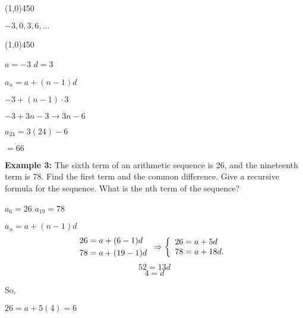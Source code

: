 \documentclass{report}
\begin{document}
\line(1,0){450}

\begin{center}
\begin{large}
	$-3,0,3,6,\ldots$
\end{large}
\end{center}

\line(1,0){450}

\begin{center}
	$a = -3$ \hspace{10mm} $d = 3$
	\vspace{4mm}

	$a_n = a +(n-1)d$ 
	\vspace{2mm}

	$-3 +(n-1)\cdot 3$
	\vspace{2mm}

	$-3+3n-3 \rightarrow 3n-6$
	\vspace{2mm}
	
	$a_{24} = 3(24) -6$
	\vspace{2mm}

	$=\boxed{66}$
\end{center}
\bigbreak \noindent \bigbreak \noindent \bigbreak \noindent

\begin{large}
\noindent \textbf{Example 3:} 
	 The sixth term of an arithmetic sequence is 26, and the nineteenth term is 78. Find the first term and the common difference. Give a recursive formula for the sequence. What is the nth term of the sequence? 
\end{large}

\begin{center}
\hspace{10mm} $a_6 = 26$ \hspace{10mm} $a_{19} = 78$ \hspace{10mm}
\vspace{3mm}

$a_n = a + (n-1)d$
$$
\begin{aligned}
& 26=a+(6-1) d \\
& 78=a+(19-1) d
	\end{aligned} \hspace{2mm} \Rightarrow\left\{\begin{array}{l}
26=a+5 d \\
78=a+18 d .
\end{array}\right.
$$
$$52 = 13d$$
$$4 =d$$
\end{center}
So,

$26 = a + 5(4) =6$
\end{document}
